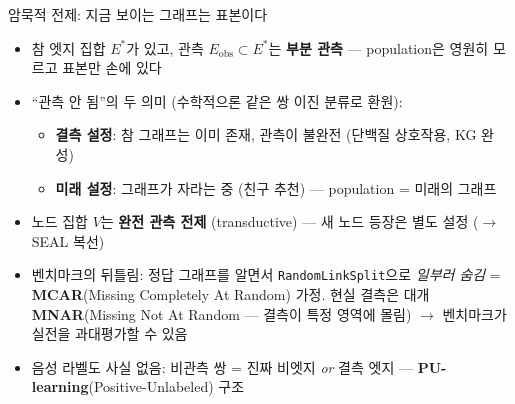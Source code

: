 \begin{frame}{암묵적 전제: 지금 보이는 그래프는 표본이다}
\begin{itemize}
  \item 참 엣지 집합 $E^*$가 있고, 관측 $E_{\text{obs}} \subset E^*$는 \textbf{부분 관측} — population은 영원히 모르고 표본만 손에 있다
  \item ``관측 안 됨''의 두 의미 (수학적으론 같은 쌍 이진 분류로 환원):
  \begin{itemize}
    \item \textbf{결측 설정}: 참 그래프는 이미 존재, 관측이 불완전 (단백질 상호작용, KG 완성)
    \item \textbf{미래 설정}: 그래프가 자라는 중 (친구 추천) — population = 미래의 그래프
  \end{itemize}
  \item 노드 집합 $V$는 \textbf{완전 관측 전제} (transductive) — 새 노드 등장은 별도 설정 ($\to$ SEAL 복선)
  \item 벤치마크의 뒤틀림: 정답 그래프를 알면서 \texttt{RandomLinkSplit}으로 \emph{일부러 숨김} = \textbf{MCAR}(Missing Completely At Random) 가정. 현실 결측은 대개 \textbf{MNAR}(Missing Not At Random — 결측이 특정 영역에 몰림) $\to$ 벤치마크가 실전을 과대평가할 수 있음
  \item 음성 라벨도 사실 없음: 비관측 쌍 = 진짜 비엣지 \emph{or} 결측 엣지 — \textbf{PU-learning}(Positive-Unlabeled) 구조
\end{itemize}
\end{frame}


